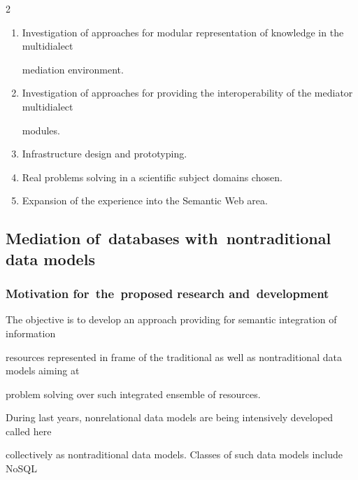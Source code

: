 \begin{multicols}{2}
\begin{enumerate}[1.]
etc.).


\item Investigation of approaches for modular representation of knowledge in the multidialect 


mediation environment.


\item Investigation of approaches for providing the interoperability of the mediator multidialect 


modules.


\item Infrastructure design and prototyping.


\item Real problems solving in a scientific subject domains chosen.


\item Expansion of the experience into the Semantic Web area.


\end{enumerate}





\subsection{Mediation of~databases with~nontraditional data models}





\subsubsection{Motivation for~the~proposed research and~development}





\noindent


The objective is to develop an approach providing for semantic integration of information 


resources represented in frame of the traditional as well as nontraditional data models aiming at 


problem solving over such integrated ensemble of resources. 





During last years, nonrelational data models are being intensively developed called here 


collectively as nontraditional data models. Classes of such data models include NoSQL



\end{multicols}
